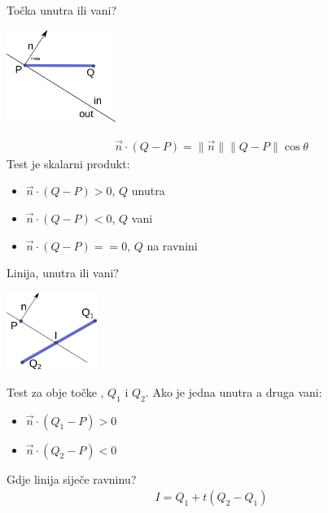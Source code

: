 \documentclass[9pt]{beamer}
\begin{document}
\begin{frame}{Točka unutra ili vani?}
	\begin{center}
		\includegraphics[height=3cm]{slike/p05_03.png}
	\end{center}
	\begin{align*}
	\vec{n}\cdot(Q-P)=\|\vec{n}\|\|Q-P\|\cos \theta
	\end{align*}
	Test je skalarni produkt:
	\begin{itemize}
		\item $\vec{n}\cdot(Q-P) > 0$, $Q$ unutra
		\item $\vec{n}\cdot(Q-P) < 0$, $Q$ vani
		\item $\vec{n}\cdot(Q-P) == 0$, $Q$ na ravnini
	\end{itemize}
\end{frame}

\begin{frame}{Linija, unutra ili vani?}
	\begin{center}
		\includegraphics[height=2.5cm]{slike/p05_04.png}
	\end{center}
	Test za obje točke , $Q_1$ i $Q_2$. Ako je jedna unutra a druga vani:
	\begin{itemize}
		\item $\vec{n}\cdot(Q_1-P) > 0$
		\item $\vec{n}\cdot(Q_2-P) < 0$
	\end{itemize}
	Gdje linija siječe ravninu?
	\begin{align*}
	I = Q_1+t(Q_2-Q_1)
	\end{align*}
\end{frame}
\end{document}
